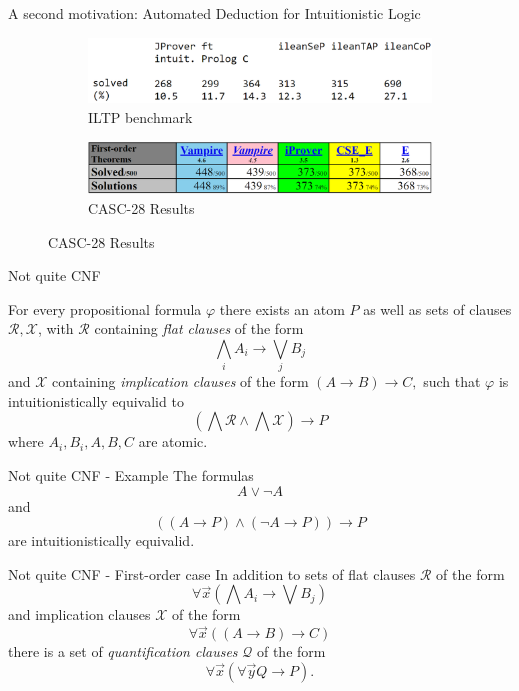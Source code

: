 \documentclass{cubeamer}
\begin{document}
	\begin{frame}{A second motivation: Automated Deduction for Intuitionistic Logic}
		\begin{figure}
		\begin{subfigure}[b]{\textwidth}
			\centering
				\includegraphics[width=\textwidth]{iltp.png}
			\caption{ILTP benchmark}
		\end{subfigure}
		\begin{subfigure}[b]{\textwidth}
			\includegraphics[width=\textwidth]{CASC.png}
			\caption{CASC-28 Results}
		\end{subfigure}
		\end{figure}
	\end{frame}


	\begin{frame}{Not quite CNF}
		\begin{lemma}
	For every propositional formula $\varphi$ there exists an atom $P$ as well as sets of clauses $\mathcal R, \mathcal X$, with $\mathcal R$ containing  \emph{flat clauses} of the form
	$$\bigwedge_iA_i\to\bigvee_jB_j$$
	and $\mathcal X$ containing \emph{implication clauses} of the form
	$(A\to B)\to C,$
	such that $\varphi$ is intuitionistically equivalid to
	$$\left(\bigwedge\mathcal R\wedge\bigwedge\mathcal X\right)\to P$$where $A_i, B_i, A, B, C$ are atomic.
			\end{lemma}	
	\end{frame}

	\begin{frame}{Not quite CNF - Example}
		The formulas \[A\vee\neg A\] and \[((A\to P)\wedge(\neg A\to P))\to P\] are intuitionistically equivalid.
	\end{frame}
	
	\begin{frame}{Not quite CNF - First-order case}
		In addition to sets of flat clauses $\mathcal R$ of the form
	$$\forall\vec x\left(\bigwedge A_i\to\bigvee B_j\right)$$ and implication clauses $\mathcal X$ of the form
	$$\forall\vec x((A\to B)\to C)$$ there is a set of \emph{quantification clauses} $\mathcal Q$ of the form $$\forall \vec x(\forall \vec yQ\to P).$$
	\end{frame}
	
\end{document}
